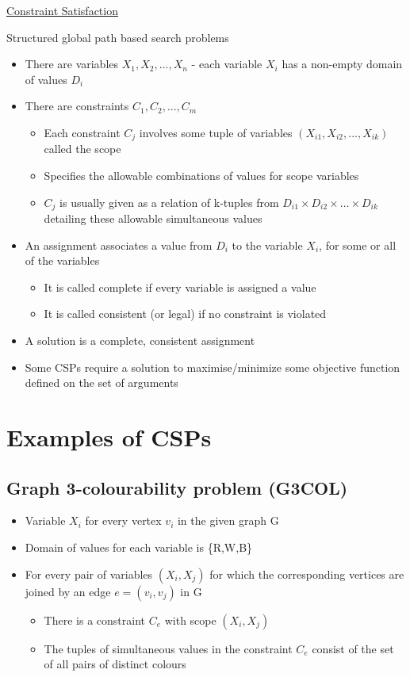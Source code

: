 \documentclass{article}[18pt]
\begin{document}
\begin{center}
\underline{\huge Constraint Satisfaction}
\end{center}

\begin{defin}
Structured global path based search problems
\begin{itemize}
	\item There are variables $X_1,X_2,...,X_n$ - each variable $X_i$ has a non-empty domain of values $D_i$
	\item There are constraints $C_1,C_2,...,C_m$
	\begin{itemize}
		\item Each constraint $C_j$ involves some tuple of variables $(X_{i1}, X_{i2},...,X_{ik})$ called the scope
		\item Specifies the allowable combinations of values for scope variables
		\item $C_j$ is usually given as a relation of k-tuples from $D_{i1}\times D_{i2}\times \ldots \times D_{ik}$ detailing these allowable simultaneous values
	\end{itemize}
	\item An assignment associates a value from $D_i$ to the variable $X_i$, for some or all of the variables
	\begin{itemize}
		\item It is called complete if every variable is assigned a value
		\item It is called consistent (or legal) if no constraint is violated
	\end{itemize}
	\item A solution is a complete, consistent assignment
	\item Some CSPs require a solution to maximise/minimize some objective function defined on the set of arguments
\end{itemize}
\end{defin}
\section{Examples of CSPs}
\subsection{Graph 3-colourability problem (G3COL)}
\begin{itemize}
	\item Variable $X_i$ for every vertex $v_i$ in the given graph G
	\item Domain of values for each variable is \{R,W,B\}
	\item For every pair of variables $(X_i,X_j)$ for which the corresponding vertices are joined by an edge $e=(v_i,v_j)$ in G
	\begin{itemize}
		\item There is a constraint $C_e$ with scope $(X_i,X_j)$
		\item The tuples of simultaneous values in the constraint $C_e$ consist of the set of all pairs of distinct colours
	\end{itemize}
\end{itemize}
\end{document}
